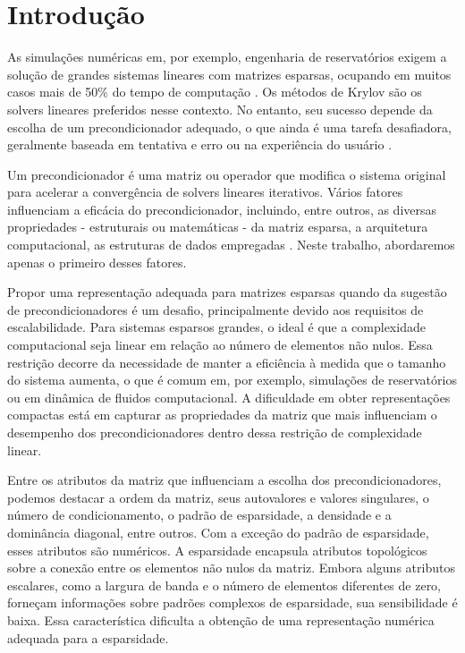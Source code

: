 \documentclass{pssbmac}
\begin{document}
\section{Introdução}\label{sec:intro}

As simulações numéricas em, por exemplo, engenharia de reservatórios exigem 
a solução de grandes sistemas lineares com matrizes esparsas, ocupando em muitos casos mais de 50\% 
do tempo de computação 
\cite{gasparini21HybridParallelIterativeSparseLinearSolverFramework,gaganis2012machine}. 
Os métodos de Krylov são os solvers lineares preferidos nesse contexto. 
No entanto, seu sucesso depende da escolha de um precondicionador adequado, 
o que ainda é uma tarefa desafiadora, 
geralmente baseada em tentativa e erro ou na experiência do usuário 
\cite{saad2003iterative,scott2023introduction}.

Um precondicionador é uma matriz ou operador que modifica o sistema original 
para acelerar a convergência de solvers lineares iterativos. Vários fatores influenciam a 
eficácia do precondicionador, incluindo, entre outros, as diversas propriedades - estruturais ou matemáticas - da matriz esparsa,
a arquitetura computacional, as estruturas de dados empregadas 
\cite{benzi2002preconditioning,bell2008efficient}. 
Neste trabalho, abordaremos apenas o primeiro desses fatores.

Propor uma representação adequada para matrizes esparsas quando da sugestão de 
precondicionadores é um desafio, principalmente devido aos requisitos de escalabilidade. 
Para sistemas esparsos grandes, o ideal é que a complexidade computacional seja linear 
em relação ao número de elementos não nulos. Essa restrição decorre da necessidade de 
manter a eficiência à medida que o tamanho do sistema aumenta, o que é comum em, por exemplo, 
simulações de reservatórios ou em dinâmica de fluidos computacional. 
A dificuldade em obter representações compactas está em capturar as propriedades 
da matriz que mais influenciam o desempenho dos precondicionadores dentro 
dessa restrição de complexidade linear.

Entre os atributos da matriz que influenciam a escolha dos precondicionadores, 
podemos destacar a ordem da matriz, seus autovalores e valores singulares, 
o número de condicionamento, o padrão de esparsidade, a densidade e a dominância diagonal, 
entre outros.  Com a exceção do padrão de esparsidade, esses atributos são numéricos. A esparsidade
encapsula atributos topológicos sobre a conexão entre os elementos não nulos da matriz. 
Embora alguns atributos escalares, como a largura de banda e o número de elementos diferentes 
de zero, forneçam informações sobre padrões complexos de esparsidade, 
sua sensibilidade é baixa. Essa característica dificulta a obtenção de 
uma representação numérica adequada para a esparsidade. 
\end{document}
